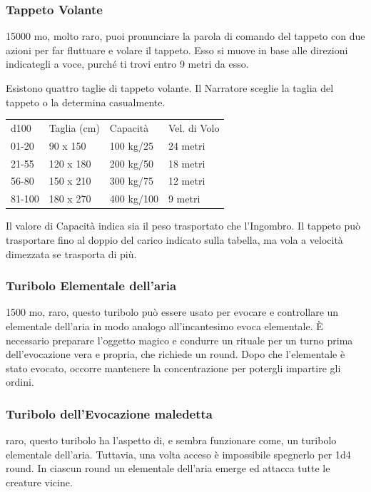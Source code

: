 \begin{multicols}{2}
	\subsubsection*{Tappeto Volante}
	15000 mo, molto raro, puoi pronunciare la parola di comando del tappeto con due azioni per far fluttuare e volare il tappeto. Esso si muove in base alle direzioni indicategli a voce, purché ti trovi entro 9 metri da esso.

	Esistono quattro taglie di tappeto volante. Il Narratore sceglie la taglia del tappeto o la determina casualmente.

	\medskip

	\begin{tabular}{llll}
		d100 &Taglia (cm)&Capacità &Vel. di Volo\\
		01-20& 90 x 150 &100 kg/25&24 metri\\
		21-55& 120 x 180 &200 kg/50&18 metri\\
		56-80& 150 x 210 &300 kg/75&12 metri\\
		81-100& 180  x 270 & 400 kg/100& 9 metri\\
	\end{tabular}

	\medskip
	Il valore di Capacità indica sia il peso trasportato che l'Ingombro. Il tappeto può trasportare fino al doppio del carico indicato sulla tabella, ma vola a velocità dimezzata se trasporta di più.

	\subsubsection*{Turibolo Elementale dell’aria}
	1500 mo, raro, questo turibolo può essere usato per evocare e controllare un elementale dell’aria in modo analogo all’incantesimo evoca elementale. È necessario preparare l'oggetto magico e condurre un rituale per un turno prima dell’evocazione vera e propria, che richiede un round. Dopo che l’elementale è stato evocato, occorre mantenere la concentrazione per potergli impartire gli ordini.

	\subsubsection*{Turibolo dell’Evocazione maledetta}
	raro, questo turibolo ha l'aspetto di, e sembra funzionare come, un turibolo elementale dell’aria. Tuttavia, una volta acceso è impossibile spegnerlo per 1d4 round. In ciascun round un elementale dell’aria emerge ed attacca tutte le creature vicine.


\end{multicols}
